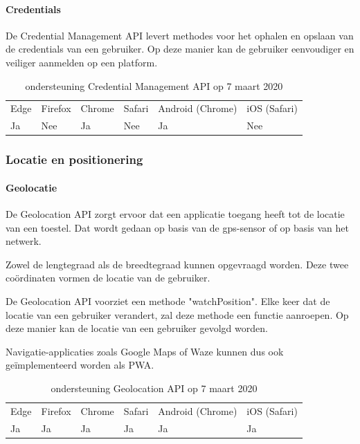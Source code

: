 	\paragraph{Credentials}
	De Credential Management API \autocite{West2019} levert methodes voor het ophalen en opslaan van de credentials van een gebruiker. Op deze manier kan de gebruiker eenvoudiger en veiliger aanmelden op een platform.
	
	\begin{table}[H]
		\begin{tabular}{llllll}
			Edge & Firefox & Chrome & Safari & Android (Chrome) & iOS (Safari) \\
			Ja   & Nee      &  Ja     & Nee     & Ja               & Nee          
		\end{tabular}	
		\caption{ondersteuning Credential Management API op 7 maart 2020}
	\end{table}
	
	\subsubsection{Locatie en positionering}
	
	\paragraph{Geolocatie}
	De Geolocation API \autocite{Popescu2018} zorgt ervoor dat een applicatie toegang heeft tot de locatie van een toestel. Dat wordt gedaan op basis van de gps-sensor of op basis van het netwerk. 
	
	Zowel de lengtegraad als de breedtegraad kunnen opgevraagd worden. Deze twee coördinaten vormen de locatie van de gebruiker.
	
	
	De Geolocation API voorziet een methode "watchPosition". Elke keer dat de locatie van een gebruiker verandert, zal deze methode een functie aanroepen. Op deze manier kan de locatie van een gebruiker gevolgd worden.
	
	Navigatie-applicaties zoals Google Maps of Waze kunnen dus ook geïmplementeerd worden als PWA.
	
	\begin{table}[H]
		\centering
		\begin{tabular}{llllll}
			Edge & Firefox & Chrome & Safari & Android (Chrome) & iOS (Safari) \\
			Ja   & Ja      &  Ja     & Ja     & Ja               & Ja          
		\end{tabular}	
		\caption{ondersteuning Geolocation API op 7 maart 2020}
	\end{table}
	
